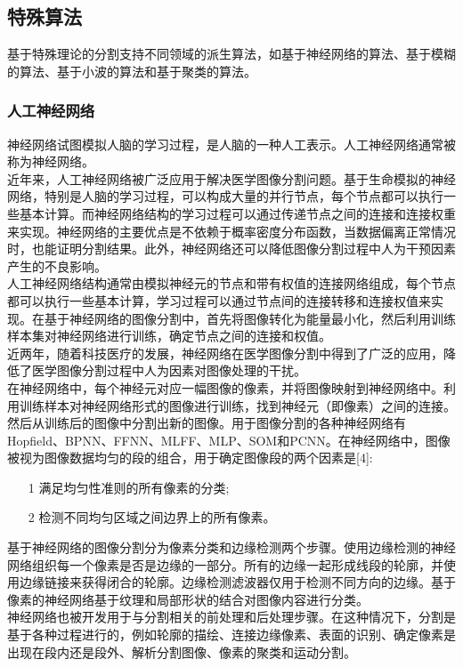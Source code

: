 \documentclass[conference]{IEEEtran}
\begin{document}
\subsection{特殊算法}
基于特殊理论的分割支持不同领域的派生算法，如基于神经网络的算法、基于模糊的算法、基于小波的算法和基于聚类的算法。
\subsubsection{人工神经网络}
神经网络试图模拟人脑的学习过程，是人脑的一种人工表示。人工神经网络通常被称为神经网络。\\近年来，人工神经网络被广泛应用于解决医学图像分割问题。基于生命模拟的神经网络，特别是人脑的学习过程，可以构成大量的并行节点，每个节点都可以执行一些基本计算。而神经网络结构的学习过程可以通过传递节点之间的连接和连接权重来实现。神经网络的主要优点是不依赖于概率密度分布函数，当数据偏离正常情况时，也能证明分割结果。此外，神经网络还可以降低图像分割过程中人为干预因素产生的不良影响。\\
人工神经网络结构通常由模拟神经元的节点和带有权值的连接网络组成，每个节点都可以执行一些基本计算，学习过程可以通过节点间的连接转移和连接权值来实现。在基于神经网络的图像分割中，首先将图像转化为能量最小化，然后利用训练样本集对神经网络进行训练，确定节点之间的连接和权值。\\
近两年，随着科技医疗的发展，神经网络在医学图像分割中得到了广泛的应用，降低了医学图像分割过程中人为因素对图像处理的干扰。\\
在神经网络中，每个神经元对应一幅图像的像素，并将图像映射到神经网络中。利用训练样本对神经网络形式的图像进行训练，找到神经元（即像素）之间的连接。然后从训练后的图像中分割出新的图像。用于图像分割的各种神经网络有Hopfield、BPNN、FFNN、MLFF、MLP、SOM和PCNN。在神经网络中，图像被视为图像数据均匀的段的组合，用于确定图像段的两个因素是[4]:
\begin{itemize}
\item [1] 满足均匀性准则的所有像素的分类;
\item [2] 检测不同均匀区域之间边界上的所有像素。
\end{itemize}
基于神经网络的图像分割分为像素分类和边缘检测两个步骤。使用边缘检测的神经网络组织每一个像素是否是边缘的一部分。所有的边缘一起形成线段的轮廓，并使用边缘链接来获得闭合的轮廓。边缘检测滤波器仅用于检测不同方向的边缘。基于像素的神经网络基于纹理和局部形状的结合对图像内容进行分类。\\
神经网络也被开发用于与分割相关的前处理和后处理步骤。在这种情况下，分割是基于各种过程进行的，例如轮廓的描绘、连接边缘像素、表面的识别、确定像素是出现在段内还是段外、解析分割图像、像素的聚类和运动分割。
\end{document}
